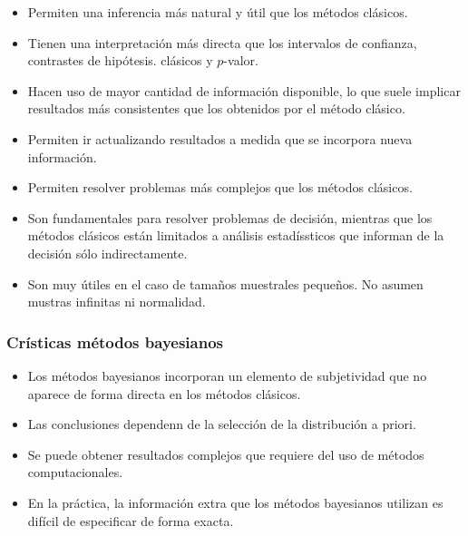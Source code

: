 \begin{itemize}
    \item Permiten una inferencia más natural y útil que los métodos clásicos. 
    \item Tienen una interpretación más directa que los intervalos de confianza, contrastes de hipótesis.
    clásicos y $p$-valor.
    \item Hacen uso de mayor cantidad de información disponible, lo que suele implicar resultados más consistentes que los obtenidos por el método clásico. 
    \item Permiten ir actualizando resultados a medida que se incorpora nueva información. 
    \item Permiten resolver problemas más complejos que los métodos clásicos. 
    \item Son fundamentales para resolver problemas de decisión, mientras que los métodos clásicos están limitados a análisis estadíssticos que informan de la decisión sólo indirectamente.
    \item Son muy útiles en el caso de tamaños muestrales pequeños. No asumen mustras infinitas ni normalidad.
\end{itemize}

\subsubsection{Crísticas métodos bayesianos}
\begin{itemize}
    \item Los métodos bayesianos incorporan un elemento de subjetividad que no aparece de forma directa en los métodos clásicos.
    \item Las conclusiones dependenn de la selección de la distribución a priori.
    \item Se puede obtener resultados complejos que requiere del uso de métodos computacionales.
    \item En la práctica, la información extra que los métodos bayesianos utilizan es difícil de especificar de forma exacta.
\end{itemize}